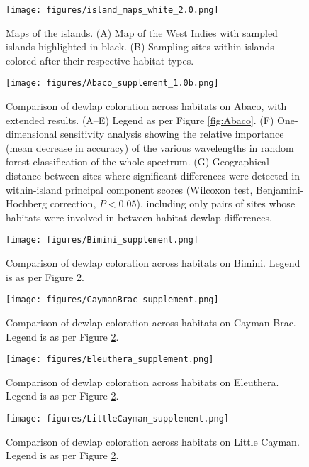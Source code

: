 \begin{figure}[H]
	\centering
	\texttt{[image: figures/island\_maps\_white\_2.0.png]}
	\caption{Maps of the islands. (A) Map of the West Indies with sampled islands highlighted in black. (B) Sampling sites within islands colored after their respective habitat types.}
	\label{fig:maps}
\end{figure}

\begin{figure}[H]
	\centering
	\texttt{[image: figures/Abaco\_supplement\_1.0b.png]}
	\caption{Comparison of dewlap coloration across habitats on Abaco, with extended results. (A--E) Legend as per Figure \ref{fig:Abaco}. (F) One-dimensional sensitivity analysis showing the relative importance (mean decrease in accuracy) of the various wavelengths in random forest classification of the whole spectrum. (G) Geographical distance between sites where significant differences were detected in within-island principal component scores (Wilcoxon test, Benjamini-Hochberg correction, $P < 0.05$), including only pairs of sites whose habitats were involved in between-habitat dewlap differences.}
	\label{fig:Abaco_supplement}
\end{figure}

\begin{figure}[H]
	\centering
	\texttt{[image: figures/Bimini\_supplement.png]}
	\caption{Comparison of dewlap coloration across habitats on Bimini. Legend is as per Figure \ref{fig:Abaco_supplement}.}
	\label{fig:Bimini}
\end{figure}

\begin{figure}[H]
	\centering
	\texttt{[image: figures/CaymanBrac\_supplement.png]}
	\caption{Comparison of dewlap coloration across habitats on Cayman Brac. Legend is as per Figure \ref{fig:Abaco_supplement}.}
	\label{fig:CaymanBrac}
\end{figure}

\begin{figure}[H]
	\centering
	\texttt{[image: figures/Eleuthera\_supplement.png]}
	\caption{Comparison of dewlap coloration across habitats on Eleuthera. Legend is as per Figure \ref{fig:Abaco_supplement}.}
	\label{fig:Eleuthera}
\end{figure}

\begin{figure}[H]
	\centering
	\texttt{[image: figures/LittleCayman\_supplement.png]}
	\caption{Comparison of dewlap coloration across habitats on Little Cayman. Legend is as per Figure \ref{fig:Abaco_supplement}.}
	\label{fig:LittleCayman}
\end{figure}


